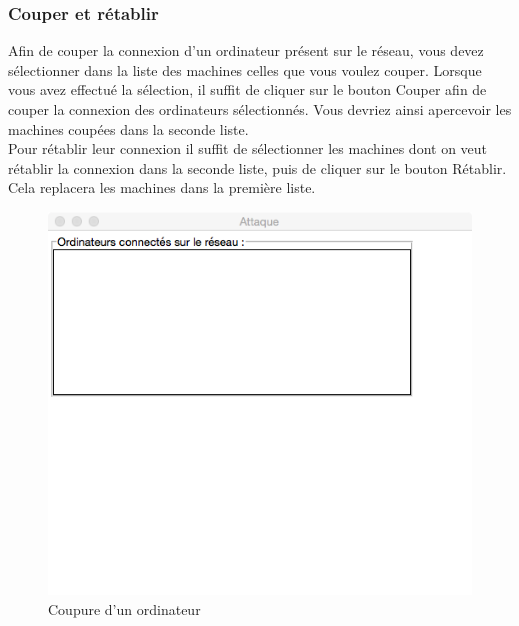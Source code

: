 \documentclass[11pt]{article}
\begin{document}
\subsubsection{Couper et rétablir}
Afin de couper la connexion d'un ordinateur présent sur le réseau, vous devez sélectionner dans la liste des machines celles que vous voulez couper. Lorsque vous avez effectué la sélection, il suffit de cliquer sur le bouton Couper afin de couper la connexion des ordinateurs sélectionnés. Vous devriez ainsi apercevoir les machines coupées dans la seconde liste.~\\
Pour rétablir leur connexion il suffit de sélectionner les machines dont on veut rétablir la connexion dans la seconde liste, puis de cliquer sur le bouton Rétablir. Cela replacera les machines dans la première liste.
\begin{figure}[!h]
\centering
\includegraphics[scale=0.6]{./Captures/fausseFenetre.png}
\caption{Coupure d'un ordinateur}
\end{figure}
\end{document}
